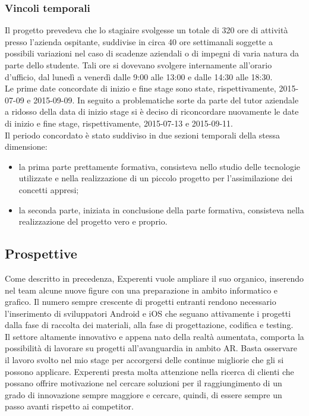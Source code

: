 \subsubsection{Vincoli temporali}
Il progetto prevedeva che lo stagiaire svolgesse un totale di 320 ore di attività presso l’azienda ospitante, suddivise in circa 40 ore settimanali soggette a possibili variazioni nel caso di scadenze aziendali o di impegni di varia natura da parte dello studente. Tali ore si dovevano svolgere internamente all’orario d’ufficio, dal lunedì a venerdì dalle 9:00 alle 13:00 e dalle 14:30 alle 18:30.
\\
Le prime date concordate di inizio e fine stage sono state, rispettivamente, 2015-07-09 e 2015-09-09. In seguito a problematiche sorte da parte del tutor aziendale a ridosso della data di inizio stage si \`e deciso di riconcordare nuovamente le date di inizio e fine stage, rispettivamente, 2015-07-13 e 2015-09-11. 
\\
Il periodo concordato \`e stato suddiviso in due sezioni temporali della stessa dimensione:
\begin{itemize}
	\item la prima parte prettamente formativa, consisteva nello studio delle tecnologie utilizzate e nella realizzazione di un piccolo progetto per l'assimilazione dei concetti appresi;
	\item la seconda parte, iniziata in conclusione della parte formativa, consisteva nella realizzazione del progetto vero e proprio.
\end{itemize}

\subsection{Prospettive}
Come descritto in precedenza, Experenti vuole ampliare il suo organico, inserendo nel team alcune nuove figure con una preparazione in ambito informatico e grafico. Il numero sempre crescente di progetti entranti rendono necessario l'inserimento di sviluppatori Android e iOS che seguano attivamente i progetti dalla fase di raccolta dei materiali, alla fase di progettazione, codifica e testing.
\\
Il settore altamente innovativo e appena nato della realt\`a aumentata, comporta la possibilit\`a di lavorare su progetti all'avanguardia in ambito AR. Basta osservare il lavoro svolto nel mio stage per accorgersi delle continue migliorie che gli si possono applicare. Experenti presta molta attenzione nella ricerca di clienti che possano offrire motivazione nel cercare soluzioni per il raggiungimento di un grado di innovazione sempre maggiore e cercare, quindi, di essere sempre un passo avanti rispetto ai competitor.